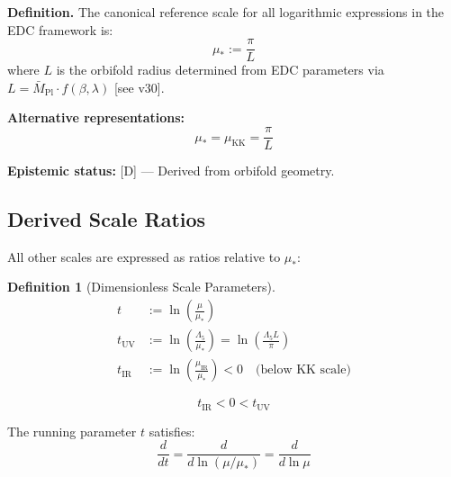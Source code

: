 \documentclass[11pt,a4paper]{article}
\theoremstyle{definition}
\newtheorem{definition}{Definition}[section]
\begin{document}
\begin{refscalebox}
\textbf{Definition.} The canonical reference scale for all logarithmic expressions
in the EDC framework is:
\begin{equation}
\label{eq:mu_star_def}
\boxed{\mu_* := \frac{\pi}{L}}
\end{equation}
where $L$ is the orbifold radius determined from EDC parameters via
$L = \bar{M}_{\text{Pl}} \cdot f(\beta, \lambda)$ [see v30].

\textbf{Alternative representations:}
\begin{equation}
\label{eq:mu_star_alt}
\mu_* = \mu_{\text{KK}} = \frac{\pi}{L}
\end{equation}

\textbf{Epistemic status:} [D] — Derived from orbifold geometry.
\end{refscalebox}

\subsection{Derived Scale Ratios}
\label{subsec:scale_ratios}

All other scales are expressed as ratios relative to $\mu_*$:

\begin{definition}[Dimensionless Scale Parameters]
\label{def:scale_params}
\begin{align}
\label{eq:t_def}
t &:= \ln\left(\frac{\mu}{\mu_*}\right) \\
\label{eq:t_UV_def}
t_{\text{UV}} &:= \ln\left(\frac{\Lambda_5}{\mu_*}\right) = \ln\left(\frac{\Lambda_5 L}{\pi}\right) \\
\label{eq:t_IR_def}
t_{\text{IR}} &:= \ln\left(\frac{\mu_{\text{IR}}}{\mu_*}\right) < 0 \quad \text{(below KK scale)}
\end{align}
\end{definition}

\begin{equation}
\label{eq:scale_hierarchy}
t_{\text{IR}} < 0 < t_{\text{UV}}
\end{equation}

The running parameter $t$ satisfies:
\begin{equation}
\label{eq:t_running}
\frac{d}{dt} = \frac{d}{d\ln(\mu/\mu_*)} = \frac{d}{d\ln\mu}
\end{equation}
\end{document}
